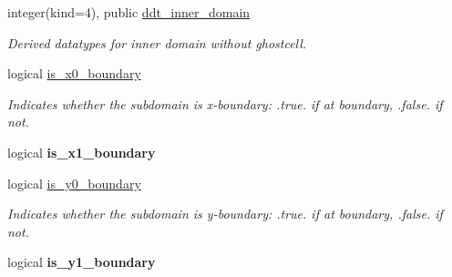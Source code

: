 \textbf{ }\par
\begin{DoxyCompactItemize}
\item 
\mbox{\label{structgeometry_1_1subdomain_a6115dacee3e1f5aaf4cc70958ed7d9e8}} 
integer(kind=4), public \hyperlink{structgeometry_1_1subdomain_a6115dacee3e1f5aaf4cc70958ed7d9e8}{ddt\+\_\+inner\+\_\+domain}
\begin{DoxyCompactList}\small\item\em Derived datatypes for inner domain without ghostcell. \end{DoxyCompactList}\end{DoxyCompactItemize}

\textbf{ }\par
\begin{DoxyCompactItemize}
\item 
\mbox{\label{structgeometry_1_1subdomain_ad4249dd7798aeeec124c9d573c8d4330}} 
logical \hyperlink{structgeometry_1_1subdomain_ad4249dd7798aeeec124c9d573c8d4330}{is\+\_\+x0\+\_\+boundary}
\begin{DoxyCompactList}\small\item\em Indicates whether the subdomain is x-\/boundary\+: .true. if at boundary, .false. if not. \end{DoxyCompactList}\item 
\mbox{\label{structgeometry_1_1subdomain_ab3fa65e9d28568523cf8ed8f5724929a}} 
logical {\bfseries is\+\_\+x1\+\_\+boundary}
\end{DoxyCompactItemize}

\textbf{ }\par
\begin{DoxyCompactItemize}
\item 
\mbox{\label{structgeometry_1_1subdomain_a3d99e9e6d3d0a6fa70339d1e5e621fb4}} 
logical \hyperlink{structgeometry_1_1subdomain_a3d99e9e6d3d0a6fa70339d1e5e621fb4}{is\+\_\+y0\+\_\+boundary}
\begin{DoxyCompactList}\small\item\em Indicates whether the subdomain is y-\/boundary\+: .true. if at boundary, .false. if not. \end{DoxyCompactList}\item 
\mbox{\label{structgeometry_1_1subdomain_a16c4acb7f07ab53f0203be8c939ab629}} 
logical {\bfseries is\+\_\+y1\+\_\+boundary}
\end{DoxyCompactItemize}

